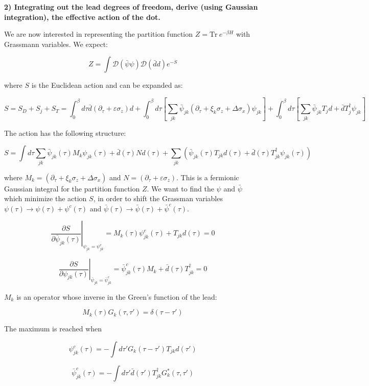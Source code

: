 \textbf{2) Integrating out the lead degrees of freedom, derive (using
Gaussian integration), the effective action of the dot.}

We are now interested in representing the partition function
\(Z =\textrm{Tr} \  e^{-\beta H}\) with Grassmann variables. We expect:

\[ Z = \int \mathcal{D}(\bar{\psi}\psi)\mathcal{D}(\bar{d}d)e^{-S}\]

where \(S\) is the Euclidean action and can be expanded as:

\[S = S_D + S_j + S_T = \int_0^\beta d\tau \bar{d}(\partial_\tau +\varepsilon \sigma_z) d + \int_0^\beta d\tau \left[ \sum_{jk} \bar{\psi}_{jk}(\partial_\tau + \xi_k \sigma_z +\Delta \sigma_x)\psi_{jk} \right] + \int_0^\beta d\tau \left[ \sum_{jk} \bar{\psi}_{jk} T_j d + \bar{d} T_j^\dagger \psi_{jk}\right]\]

The action has the following structure:

\[ S = \int d\tau \sum_{jk} \bar{\psi}_{jk}(\tau) M_k \psi_{jk}(\tau) + \bar{d}(\tau) N d(\tau) + \sum_{jk} \left(\bar{\psi}_{jk}(\tau) T_{jk} d(\tau) + \bar{d}(\tau) T_{jk}^\dagger \psi_{jk}(\tau) \right)\]

where \(M_k = (\partial_\tau + \xi_k \sigma_z + \Delta \sigma_x)\) and
\(N = (\partial_\tau + \varepsilon \sigma_z)\). This is a fermionic
Gaussian integral for the partition function \(Z\). We want to find the
\(\psi\) and \(\bar{\psi}\) which minimize the action \(S\), in order to
shift the Grassman variables
\(\psi(\tau) \rightarrow \psi(\tau) + \psi^c(\tau)\) and
\(\bar{\psi}(\tau) \rightarrow \bar{\psi}(\tau) + \bar{\psi}^c(\tau)\).

\[ \left. \frac{\partial S}{\partial \bar{\psi}_{jk}(\tau)}\right\vert_{\psi_{jk} = \psi_{jk}^c} = M_k(\tau) \psi_{jk}^c(\tau)+T_{jk}d(\tau) = 0 \]

\[ \left. \frac{\partial S}{\partial \psi_{jk}(\tau)}\right\vert_{\bar{\psi}_{jk} = \bar{\psi}_{jk}^c} = \bar{\psi}^c_{jk}(\tau) M_k + \bar{d}(\tau) T_{jk}^\dagger = 0 \]

\(M_k\) is an operator whose inverse in the Green's function of the
lead:

\[ M_k(\tau) G_k (\tau,\tau') = \delta(\tau - \tau')\]

The maximum is reached when

\[ \psi_{jk}^c(\tau) = - \int d\tau' G_k (\tau - \tau') T_{jk} d(\tau') \]

\[ \bar{\psi}_{jk}^c (\tau) = - \int d\tau' \bar{d}(\tau') T_{jk}^\dagger G_k^*(\tau, \tau')\]


